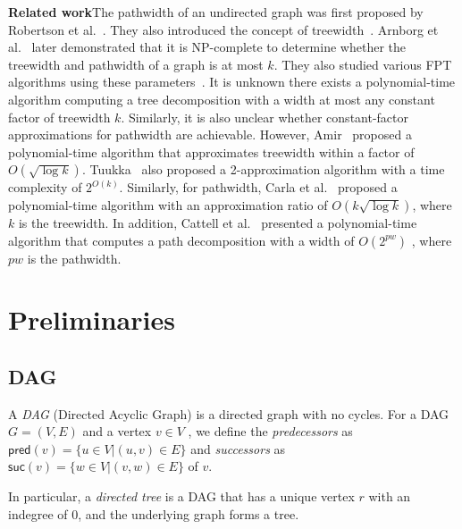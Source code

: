 \documentclass[runningheads]{llncs}
\theoremstyle{plain}
\theoremstyle{definition}
\begin{document}
\vspace{4mm}
\noindent
\textbf{Related work}\quad The pathwidth of an undirected graph was first proposed by Robertson et al.~\cite{art1}. They also introduced the concept of treewidth~\cite{art2}. Arnborg et al.~\cite{art3} later demonstrated that it is NP-complete to determine whether the treewidth and pathwidth of a graph is at most \(k\). They also studied various FPT algorithms using these parameters~\cite{art4}. It is unknown there exists a polynomial-time algorithm computing a tree decomposition with a width at most any constant factor of treewidth $k$. Similarly, it is also unclear whether constant-factor approximations for pathwidth are achievable. However, Amir~\cite{art5} proposed a polynomial-time algorithm that approximates treewidth within a factor of $O(\sqrt{\log k})$. Tuukka~\cite{art6} also proposed a 2-approximation algorithm with a time complexity of $2^{O(k)}$. Similarly, for pathwidth, Carla et al.~\cite{art7} proposed a polynomial-time algorithm with an approximation ratio of $O(k\sqrt{\log k})$, where \( k \) is the treewidth. In addition, Cattell et al.~\cite{art8} presented a polynomial-time algorithm that computes a path decomposition with a width of $O(2^{pw})$ , where $pw$ is the pathwidth.




\section{Preliminaries}

\subsection{DAG}
A \emph{DAG} (Directed Acyclic Graph) is a directed graph with no cycles. For a DAG $G = (V, E)$ and a vertex $v \in V$ , we define the \emph{predecessors} as $\mathsf{pred}(v) = \{ u \in V | (u, v) \in E\}$ and \emph{successors} as $\mathsf{suc}(v) = \{ w \in V | (v, w) \in E\}$ of $v$.

In particular, a \emph{directed tree} is a DAG that has a unique vertex $r$ with an indegree of 0, and the underlying graph forms a tree.
   
\end{document}
